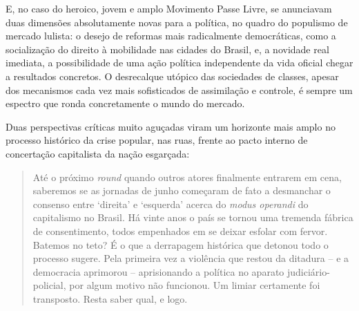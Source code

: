 E, no caso do heroico, jovem e amplo Movimento Passe Livre, se
anunciavam duas dimensões absolutamente novas para a política, no quadro
do populismo de mercado lulista: o desejo de reformas mais radicalmente
democráticas, como a socialização do direito à mobilidade nas cidades do
Brasil, e, a novidade real imediata, a possibilidade de uma ação
política independente da vida oficial chegar a resultados concretos. O
desrecalque utópico das sociedades de classes, apesar dos mecanismos
cada vez mais sofisticados de assimilação e controle, é sempre um
espectro que ronda concretamente o mundo do mercado.

Duas perspectivas críticas muito aguçadas viram um horizonte mais amplo
no processo histórico da crise popular, nas ruas, frente ao pacto
interno de concertação capitalista da nação esgarçada:

\begin{quote}
Até o próximo \emph{round} quando outros atores finalmente entrarem em
cena, saberemos se as jornadas de junho começaram de fato a desmanchar o
consenso entre `direita' e `esquerda' acerca do \emph{modus operandi} do
capitalismo no Brasil. Há vinte anos o país se tornou uma tremenda
fábrica de consentimento, todos empenhados em se deixar esfolar com
fervor. Batemos no teto? É o que a derrapagem histórica que detonou todo
o processo sugere. Pela primeira vez a violência que restou da ditadura
-- e a democracia aprimorou -- aprisionando a política no aparato
judiciário-policial, por algum motivo não funcionou. Um limiar
certamente foi transposto. Resta saber qual, e logo.
\end{quote} 

\asterisc

